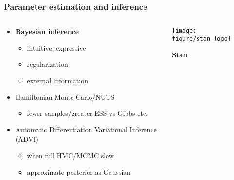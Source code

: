 \documentclass{beamer}
\begin{document}
\begin{frame}
  \frametitle{Parameter estimation and inference}
  \begin{columns}
    \begin{column}{0.45\textwidth}
      \begin{itemize}
        \item \textbf{Bayesian inference}
          \begin{itemize}
            \item intuitive, expressive
            \item regularization
            \item external information
          \end{itemize}
        \item Hamiltonian Monte Carlo/NUTS
          \begin{itemize}
            \item fewer samples/greater ESS vs Gibbs etc.
          \end{itemize}
        \item Automatic Differentiation Variational Inference (ADVI)
          \begin{itemize}
            \item when full HMC/MCMC slow
            \item approximate posterior as Gaussian
          \end{itemize}
      \end{itemize}
    \end{column}
    \begin{column}{0.55\textwidth}
      \begin{center}
        \texttt{[image: figure/stan\_logo]}

        \vspace*{0.05\textheight}

        \LARGE{\textbf{Stan}}
      \end{center}
    \end{column}
  \end{columns}
\end{frame}



%
\end{document}
